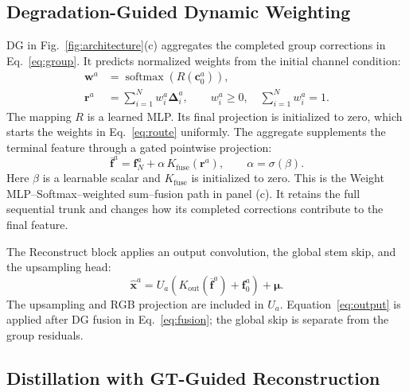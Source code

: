 \documentclass[10pt,journal,letterpaper]{IEEEtran}
\begin{document}
\subsection{Degradation-Guided Dynamic Weighting}
\label{sec:dg}

DG in Fig.~\ref{fig:architecture}(c) aggregates the completed group corrections in Eq.~\eqref{eq:group}. It predicts normalized weights from the initial channel condition:
\begin{equation}
\begin{aligned}
\mathbf w^a&=\operatorname{softmax}(R(\mathbf c_0^a)),\\
\mathbf r^a&=\sum_{i=1}^{N}w_i^a\boldsymbol\Delta_i^a,
\qquad w_i^a\geq0,\quad \sum_{i=1}^{N}w_i^a=1.
\end{aligned}
\label{eq:route}
\end{equation}
The mapping $R$ is a learned MLP. Its final projection is initialized to zero, which starts the weights in Eq.~\eqref{eq:route} uniformly. The aggregate supplements the terminal feature through a gated pointwise projection:
\begin{equation}
\overline{\mathbf f}^{a}=\mathbf f_N^a+\alpha\,K_{\mathrm{fuse}}(\mathbf r^a),
\qquad \alpha=\sigma(\beta).
\label{eq:fusion}
\end{equation}
Here $\beta$ is a learnable scalar and $K_{\mathrm{fuse}}$ is initialized to zero. This is the Weight MLP--Softmax--weighted sum--fusion path in panel (c). It retains the full sequential trunk and changes how its completed corrections contribute to the final feature.

The Reconstruct block applies an output convolution, the global stem skip, and the upsampling head:
\begin{equation}
\widehat{\mathbf x}^{a}
=U_a\!\left(K_{\mathrm{out}}(\overline{\mathbf f}^{a})+\mathbf f_0^a\right)+\boldsymbol\mu.
\label{eq:output}
\end{equation}
The upsampling and RGB projection are included in $U_a$. Equation~\eqref{eq:output} is applied after DG fusion in Eq.~\eqref{eq:fusion}; the global skip is separate from the group residuals.

\subsection{Distillation with GT-Guided Reconstruction}
\label{sec:transfer}
\end{document}
